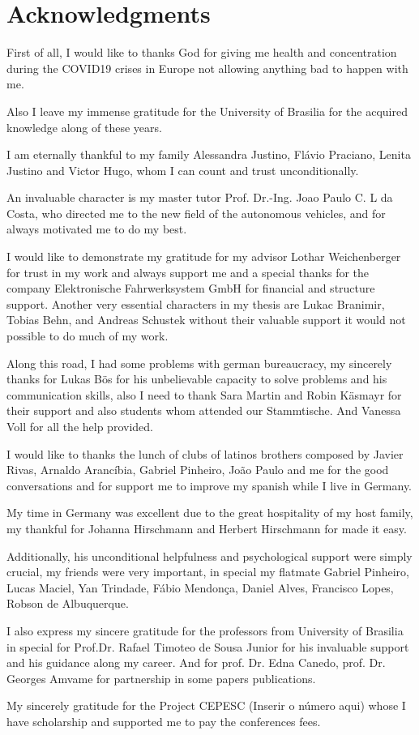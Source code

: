 \chapter*{Acknowledgments}

First of all, I would like to thanks God for giving me health and concentration during the COVID19 crises in Europe not allowing anything bad to happen with me.

Also I leave my immense gratitude for the University of Brasilia for the acquired knowledge along of these years.


I am eternally thankful to my family Alessandra Justino, Flávio Praciano, Lenita Justino and Victor Hugo, whom I can count and trust unconditionally.

An invaluable character is my master tutor Prof. Dr.-Ing. Joao Paulo C. L da Costa, who directed me to the new field of the autonomous vehicles, and for always motivated me to do my best.

I would like to demonstrate my gratitude for my advisor Lothar Weichenberger for trust in my work and always support me and a special thanks for the company Elektronische Fahrwerksystem GmbH for financial and structure support. Another very essential characters in my thesis are Lukac Branimir, Tobias Behn, and Andreas Schustek without their valuable support it would not possible to do much of my work.

Along this road, I had some problems with german bureaucracy, my sincerely thanks for Lukas Bös for his unbelievable capacity to solve problems and his communication skills, also I need to thank Sara Martin and Robin Käsmayr for their support and also students whom attended our Stammtische. And Vanessa Voll for all the help provided.

I would like to thanks the lunch of clubs of latinos brothers composed by Javier Rivas, Arnaldo Arancíbia, Gabriel Pinheiro, João Paulo and me for the good conversations and for support me to improve my spanish while I live in Germany.

My time in Germany was excellent due to the great hospitality of my host family, my thankful for Johanna Hirschmann and Herbert Hirschmann for made it easy. 

Additionally, his unconditional helpfulness and psychological support were simply
crucial, my friends were very important, in special my flatmate Gabriel Pinheiro, Lucas Maciel, Yan Trindade, Fábio Mendonça, Daniel Alves, Francisco Lopes, Robson de Albuquerque. 

I also express my sincere gratitude for the professors from University of Brasilia in special for Prof.Dr. Rafael Timoteo de Sousa Junior for his invaluable support and his guidance along my career. And for prof. Dr. Edna Canedo, prof. Dr. Georges Amvame for partnership in some papers publications.

My sincerely gratitude for the Project CEPESC (Inserir o número aqui) whose I have scholarship and supported me to pay the conferences fees.